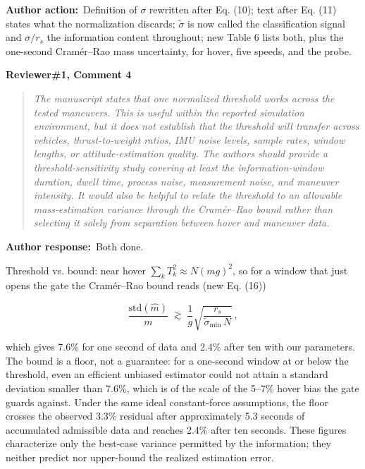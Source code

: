 \documentclass[11pt]{article}
\newcommand{\concern}[1]{\par\medskip\noindent\colorbox{gray!12}{\parbox{\dimexpr\linewidth-2\fboxsep}{\textbf{#1}}}\par\smallskip}
\newcommand{\rlabel}[1]{\par\textbf{#1}\ }
\begin{document}
\rlabel{Author action:}Definition of $\sigma$ rewritten after Eq. (10); text after Eq. (11) states what the normalization discards; $\tilde\sigma$ is now called the classification signal and $\sigma/r_s$ the information content throughout; new Table 6 lists both, plus the one-second Cram\'er--Rao mass uncertainty, for hover, five speeds, and the probe.

\concern{Reviewer\#1, Comment 4}

\begin{quote}\itshape The manuscript states that one normalized threshold works across the tested maneuvers. This is useful within the reported simulation environment, but it does not establish that the threshold will transfer across vehicles, thrust-to-weight ratios, IMU noise levels, sample rates, window lengths, or attitude-estimation quality. The authors should provide a threshold-sensitivity study covering at least the information-window duration, dwell time, process noise, measurement noise, and maneuver intensity. It would also be helpful to relate the threshold to an allowable mass-estimation variance through the Cram\'er--Rao bound rather than selecting it solely from separation between hover and maneuver data.\end{quote}

\rlabel{Author response:}Both done.

Threshold vs. bound: near hover $\sum_k T_k^2 \approx N(mg)^2$, so for a window that just opens the gate the Cram\'er--Rao bound reads (new Eq. (16))

\[\frac{\mathrm{std}(\hat m)}{m} \;\gtrsim\; \frac{1}{g}\sqrt{\frac{r_s}{\tilde\sigma_{\min}\, N}}\,,\]

which gives 7.6\% for one second of data and 2.4\% after ten with our parameters. The bound is a floor, not a guarantee: for a one-second window at or below the threshold, even an efficient unbiased estimator could not attain a standard deviation smaller than 7.6\%, which is of the scale of the 5--7\% hover bias the gate guards against. Under the same ideal constant-force assumptions, the floor crosses the observed 3.3\% residual after approximately 5.3 seconds of accumulated admissible data and reaches 2.4\% after ten seconds. These figures characterize only the best-case variance permitted by the information; they neither predict nor upper-bound the realized estimation error.
\end{document}
